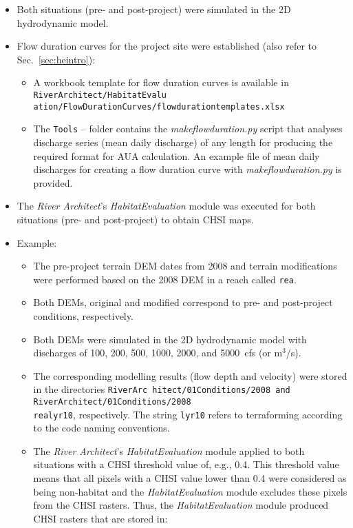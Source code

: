 \begin{itemize}
\item
  Both situations (pre- and post-project) were simulated in the 2D hydrodynamic model.
\item
  Flow duration curves for the project site were established (also refer to Sec.~\ref{sec:heintro}):
  \begin{itemize}
  \item
    A workbook template for flow duration curves is available in \texttt{RiverArchitect/HabitatEvalu ation/FlowDurationCurves/flow{\myUnderscore}duration{\myUnderscore}templates.xlsx}
  \item
    The \texttt{Tools} -- folder contains the \emph{make{\myUnderscore}flow{\myUnderscore}duration.py} script that analyses discharge series (mean daily discharge) of any length for producing the required format for AUA calculation. An example file of mean daily discharges for creating a flow duration curve with \emph{make{\myUnderscore}flow{\myUnderscore}duration.py} is provided.
  \end{itemize}
\item
  The \emph{River Architect}'s \emph{HabitatEvaluation} module was executed for both situations (pre- and post-project) to obtain CHSI maps.
\item Example:
  \begin{itemize}
  \item The pre-project terrain DEM dates from 2008 and terrain modifications were performed based on the 2008 DEM in a reach called \texttt{rea}.
  \item Both DEMs, original and modified correspond to pre- and post-project conditions, respectively.
  \item Both DEMs were simulated in the 2D hydrodynamic model with discharges of 100, 200, 500, 1000, 2000, and 5000~cfs (or m$^3$/s).
  \item The corresponding modelling results (flow depth and velocity) were stored in the directories \texttt{RiverArc hitect/01{\myUnderscore}Conditions/2008 and RiverArchitect/01{\myUnderscore}Conditions/2008{\myUnderscore}}\\
  \texttt{rea{\myUnderscore}lyr10}, respectively. The string \texttt{lyr10} refers to terraforming according to the code naming conventions.
  \item The \emph{River Architect}'s \emph{HabitatEvaluation} module applied to both situations with a CHSI threshold value of, e.g., 0.4. This threshold value means that all pixels with a CHSI value lower than 0.4 were considered as being non-habitat and the \emph{HabitatEvaluation} module excludes these pixels from the CHSI rasters. Thus, the \emph{HabitatEvaluation} module produced CHSI rasters that are stored in:

\end{itemize}
\end{itemize}
